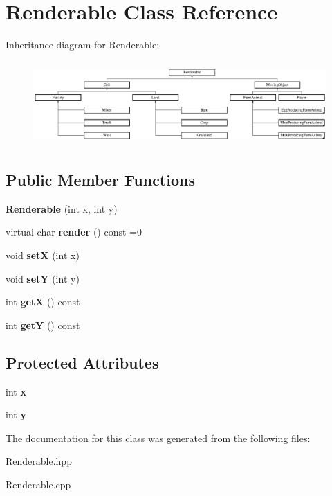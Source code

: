 \hypertarget{class_renderable}{}\section{Renderable Class Reference}
\label{class_renderable}
Inheritance diagram for Renderable\+:\begin{figure}[H]
\begin{center}
\leavevmode
\includegraphics[height=3.236994cm]{class_renderable}
\end{center}
\end{figure}
\subsection*{Public Member Functions}
\begin{DoxyCompactItemize}
\item 
\mbox{\label{class_renderable_a8d14de163e3e6ba3d87fa8a73ad7b063}} 
{\bfseries Renderable} (int x, int y)
\item 
\mbox{\label{class_renderable_af09cff67767ca4645ff24aa6cab84be6}} 
virtual char {\bfseries render} () const =0
\item 
\mbox{\label{class_renderable_a3e8517109ed3e4918d7d838e25c660a1}} 
void {\bfseries setX} (int x)
\item 
\mbox{\label{class_renderable_a521de229b0e0d647d7d9196421eaad1a}} 
void {\bfseries setY} (int y)
\item 
\mbox{\label{class_renderable_adf8b600a2eccd6f21e504d3025ed655c}} 
int {\bfseries getX} () const
\item 
\mbox{\label{class_renderable_a7eb82850bbd3ed66bba420607794dc78}} 
int {\bfseries getY} () const
\end{DoxyCompactItemize}
\subsection*{Protected Attributes}
\begin{DoxyCompactItemize}
\item 
\mbox{\label{class_renderable_a70fb7e98972efed5489a92006b4b6354}} 
int {\bfseries x}
\item 
\mbox{\label{class_renderable_aea075942b87c751b84ac96174eff5881}} 
int {\bfseries y}
\end{DoxyCompactItemize}


The documentation for this class was generated from the following files\+:\begin{DoxyCompactItemize}
\item 
Renderable.\+hpp\item 
Renderable.\+cpp\end{DoxyCompactItemize}
